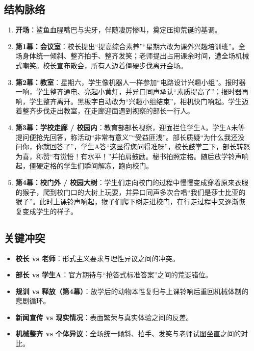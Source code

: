 \documentclass[11pt, a4paper]{article}
\begin{document}
        \subsection{结构脉络}
        \begin{enumerate}[leftmargin=2em, itemsep=0.3em]
                \item \textbf{开场}：鲨鱼血腥嘴巴与尖牙，伴随凄厉惨叫，奠定压抑荒诞的基调。
                \item \textbf{第1幕：会议室}：校长提出“提高综合素养”“星期六改为课外兴趣培训班”。全场身体统一倾斜、整齐拍手、整齐发笑；老师提出占用课余时间，遭全场机械式嘲笑。校长宣布散会，所有人迈着僵硬步伐离开会场。
                \item \textbf{第2幕：教室}：星期六，学生像机器人一样参加“电路设计兴趣小组”。报时器一响，学生整齐通电、亮起小黄灯，并异口同声承认“素质提高了”；报时器再响，学生整齐离开。黑板字自动改为“兴趣小组结束”，相机快门响起。学生迈着整齐步伐走出教室，在走廊迎面遇到视察的部长一行人。
                \item \textbf{第3幕：学校走廊 / 校园内}：教育部部长视察，迎面拦住学生A。学生A未等提问便抢先回答，称活动“非常有意义”“受益匪浅”。部长质疑“为什么我还没问你，你就回答了”，学生A答“这显得您问得准呀”，校长鼓掌三下，部长转怒为喜，称赞“有觉悟！有水平！”并拍肩鼓励。秘书拍照定格。随后放学铃声响起，僵硬定格的学生们瞬间解冻，跑向校门。
                \item \textbf{第4幕：校门外 / 校园大树}：学生们走向校门的过程中慢慢变成穿着原来衣服的猴子，爬到校门口的大树上玩耍，并异口同声多次合唱“我们是莎士比亚的猴子”。此时上课铃声响起，猴子们爬下树走进校门，在行走过程中又逐渐恢复变成学生的样子。
        \end{enumerate}

        \subsection{关键冲突}
        \begin{itemize}[leftmargin=2em, itemsep=0.2em]
                \item \textbf{校长 vs 老师}：形式主义要求与理性异议之间的冲突。
                \item \textbf{部长 vs 学生A}：官方期待与“抢答式标准答案”之间的荒诞错位。
                \item \textbf{规训 vs 释放（第4幕）}：放学后的动物本性复归与上课铃响后重回机械体制的悲剧循环。
                \item \textbf{新闻宣传 vs 现实情况}：表面繁荣与真实体验之间的反差。
                \item \textbf{机械整齐 vs 个体异议}：全场统一倾斜、拍手、发笑与老师试图坐直之间的对比。
        \end{itemize}
\end{document}
